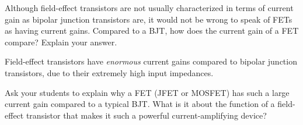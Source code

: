 

Although field-effect transistors are not usually characterized in terms of current gain as bipolar junction transistors are, it would not be wrong to speak of FETs as having current gains.  Compared to a BJT, how does the current gain of a FET compare?  Explain your answer.







Field-effect transistors have {\it enormous} current gains compared to bipolar junction transistors, due to their extremely high input impedances.







Ask your students to explain why a FET (JFET or MOSFET) has such a large current gain compared to a typical BJT.  What is it about the function of a field-effect transistor that makes it such a powerful current-amplifying device?





